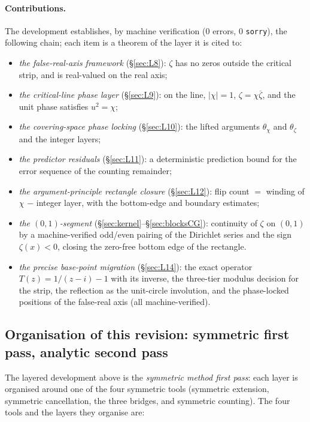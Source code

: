 \documentclass{article}
\newcommand{\zt}{\zeta}
\newcommand{\Xchi}{\chi}
\begin{document}
\paragraph{Contributions.} The development establishes, by machine
verification (0 errors, 0 \texttt{sorry}), the following chain; each
item is a theorem of the layer it is cited to:
\begin{itemize}
\item \emph{the false-real-axis framework} (\S\ref{sec:L8}): $\zt$ has no
zeros outside the critical strip, and is real-valued on the real axis;
\item \emph{the critical-line phase layer} (\S\ref{sec:L9}): on the line,
$|\Xchi|=1$, $\zt=\Xchi\overline{\zt}$, and the unit phase satisfies
$u^2=\Xchi$;
\item \emph{the covering-space phase locking} (\S\ref{sec:L10}): the
lifted arguments $\theta_\Xchi$ and $\theta_{\zt}$ and the integer layers;
\item \emph{the predictor residuals} (\S\ref{sec:L11}): a deterministic
prediction bound for the error sequence of the counting remainder;
\item \emph{the argument-principle rectangle closure} (\S\ref{sec:L12}):
flip count $=$ winding of $\Xchi$ $-$ integer layer, with the bottom-edge
and boundary estimates;
\item \emph{the $(0,1)$-segment} (\S\ref{sec:kernel}--\S\ref{sec:blocksCG}):
continuity of $\zt$ on $(0,1)$ by a machine-verified odd/even pairing of
the Dirichlet series and the sign $\zt(x)<0$, closing the zero-free bottom
edge of the rectangle.
\item \emph{the precise base-point migration} (\S\ref{sec:L14}): the exact
operator $T(z)=1/(z-i)-1$ with its inverse, the three-tier modulus decision
for the strip, the reflection as the unit-circle involution, and the
phase-locked positions of the false-real axis (all machine-verified).
\end{itemize}

\subsection{Organisation of this revision: symmetric first pass, analytic second pass}
\label{sec:org}

The layered development above is the \emph{symmetric method first
pass}: each layer is organised around one of the four symmetric tools
(symmetric extension, symmetric cancellation, the three bridges, and
symmetric counting). The four tools and the layers they organise are:
\end{document}
